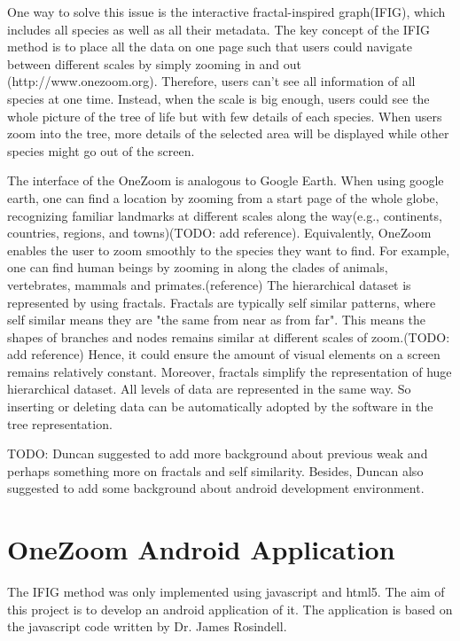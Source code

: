 \documentclass[MSc]{icldt}
\begin{document}
One way to solve this issue is the interactive fractal-inspired graph(IFIG), which includes all species as well as all their metadata. The key concept of the IFIG method is to place all the data on one page such that users could navigate between different scales by simply zooming in and out (http://www.onezoom.org). Therefore, users can't see all information of all species at one time. Instead, when the scale is big enough, users could see the whole picture of the tree of life but with few details of each species. When users zoom into the tree, more details of the selected area will be displayed while other species might go out of the screen.

The interface of the OneZoom is analogous to Google Earth. When using google earth, one can find a location by zooming from a start page of the whole globe, recognizing familiar landmarks at different scales along the way(e.g., continents, countries, regions, and towns)(TODO: add reference). Equivalently, OneZoom enables the user to zoom smoothly to the species they want to find. For example, one can find human beings by zooming in along the clades of animals, vertebrates, mammals and primates.(reference) The hierarchical dataset is represented by using fractals. Fractals are typically self similar patterns, where self similar means they are "the same from near as from far". This means the shapes of branches and nodes remains similar at different scales of zoom.(TODO: add reference) Hence, it could ensure the amount of visual elements on a screen remains relatively constant. Moreover, fractals simplify the representation of huge hierarchical dataset. All levels of data are represented in the same way. So inserting or deleting data can be automatically adopted by the software in the tree representation.

TODO: Duncan suggested to add more background about previous weak and perhaps something more on fractals and self similarity. Besides, Duncan also suggested to add some background about android development environment.



\section{OneZoom Android Application}

The IFIG method was only implemented using javascript and html5. The aim of this project is to develop an android application of it. The application is based on the javascript code written by Dr. James Rosindell. 
\end{document}
